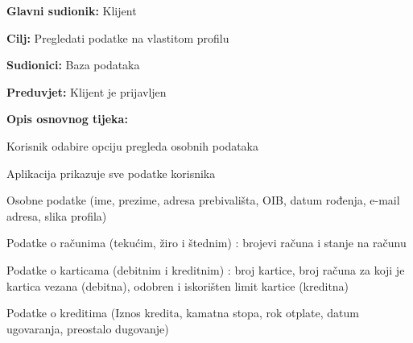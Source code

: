         		  \noindent {}
        			\begin{packed_item}
        				
        				\item \textbf{Glavni sudionik: }Klijent
        				\item  \textbf{Cilj:} Pregledati podatke na vlastitom profilu
        				\item  \textbf{Sudionici:} Baza podataka
        				\item  \textbf{Preduvjet:} Klijent je prijavljen
        				\item  \textbf{Opis osnovnog tijeka:}
        				
        				\item[] \begin{packed_enum}
        					
        					\item Korisnik odabire opciju pregleda osobnih podataka
        					\item Aplikacija prikazuje sve podatke korisnika
        					\begin{packed_enum}
        						\item Osobne podatke (ime, prezime, adresa prebivališta, OIB, datum rođenja, e-mail adresa, slika profila)
        						\item Podatke o računima (tekućim, žiro i štednim) : brojevi računa i stanje na računu
        						\item Podatke o karticama (debitnim i kreditnim) : broj kartice, broj računa za koji je kartica vezana (debitna), odobren i iskorišten limit kartice (kreditna)
        						\item Podatke o kreditima (Iznos kredita, kamatna stopa, rok otplate, datum ugovaranja, preostalo dugovanje)
        					\end{packed_enum}
    					
    				\end{packed_enum}
    				
    			\end{packed_item}
    			
